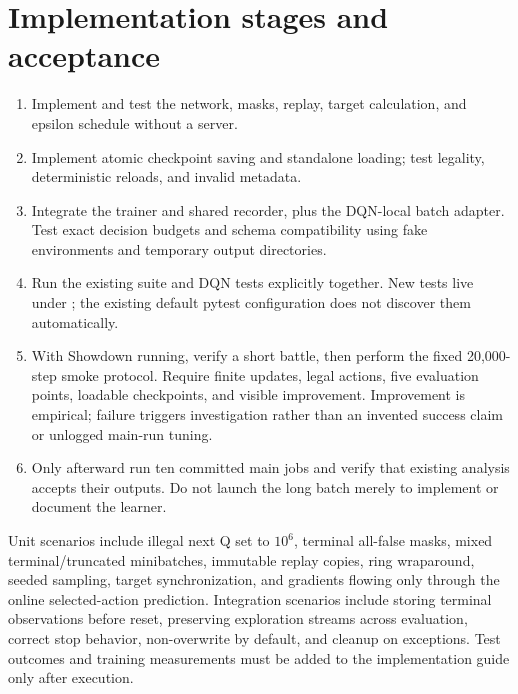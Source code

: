 \documentclass[11pt,a4paper]{article}
\newcommand{\code}[1]{\texttt{\detokenize{#1}}}
\begin{document}
\section{Implementation stages and acceptance}
\begin{enumerate}
\item Implement and test the network, masks, replay, target calculation, and epsilon schedule without a server.
\item Implement atomic checkpoint saving and standalone loading; test legality, deterministic reloads, and invalid metadata.
\item Integrate the trainer and shared recorder, plus the DQN-local batch adapter. Test exact decision budgets and schema compatibility using fake environments and temporary output directories.
\item Run the existing suite and DQN tests explicitly together. New tests live under \code{src/DQN/tests/}; the existing default pytest configuration does not discover them automatically.
\item With Showdown running, verify a short battle, then perform the fixed 20,000-step smoke protocol. Require finite updates, legal actions, five evaluation points, loadable checkpoints, and visible improvement. Improvement is empirical; failure triggers investigation rather than an invented success claim or unlogged main-run tuning.
\item Only afterward run ten committed main jobs and verify that existing analysis accepts their outputs. Do not launch the long batch merely to implement or document the learner.
\end{enumerate}

\noindent Unit scenarios include illegal next Q set to $10^6$, terminal all-false masks, mixed terminal/truncated minibatches, immutable replay copies, ring wraparound, seeded sampling, target synchronization, and gradients flowing only through the online selected-action prediction. Integration scenarios include storing terminal observations before reset, preserving exploration streams across evaluation, correct stop behavior, non-overwrite by default, and cleanup on exceptions. Test outcomes and training measurements must be added to the implementation guide only after execution.
\end{document}
